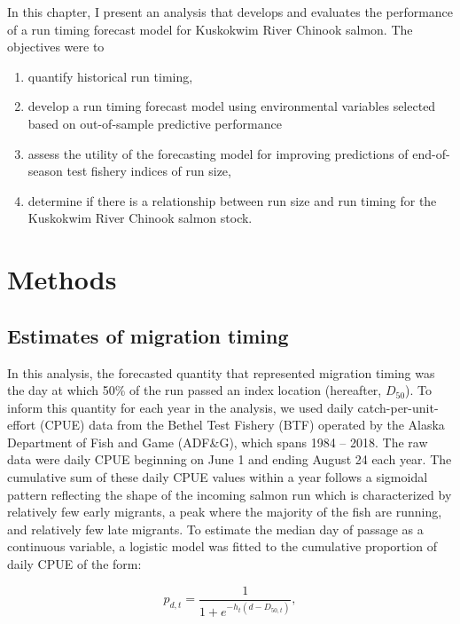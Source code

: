 \documentclass[12pt,]{book}
\providecommand{\tightlist}{%
  \setlength{\itemsep}{0pt}\setlength{\parskip}{0pt}}
\theoremstyle{definition}
\theoremstyle{definition}
\theoremstyle{definition}
\theoremstyle{remark}
\begin{document}
In this chapter, I present an analysis that develops and evaluates the
performance of a run timing forecast model for Kuskokwim River Chinook
salmon. The objectives were to

\begin{enumerate}
\def\labelenumi{(\arabic{enumi})}
\tightlist
\item
  quantify historical run timing,
\item
  develop a run timing forecast model using environmental variables
  selected based on out-of-sample predictive performance
\item
  assess the utility of the forecasting model for improving predictions
  of end-of-season test fishery indices of run size,
\item
  determine if there is a relationship between run size and run timing
  for the Kuskokwim River Chinook salmon stock.
\end{enumerate}

\section{Methods}\label{methods}

\subsection{Estimates of migration
timing}\label{estimates-of-migration-timing}

\noindent
In this analysis, the forecasted quantity that represented migration
timing was the day at which 50\% of the run passed an index location
(hereafter, \(D_{50}\)). To inform this quantity for each year in the
analysis, we used daily catch-per-unit-effort (CPUE) data from the
Bethel Test Fishery (BTF) operated by the Alaska Department of Fish and
Game (ADF\&G), which spans 1984 -- 2018. The raw data were daily CPUE
beginning on June 1 and ending August 24 each year. The cumulative sum
of these daily CPUE values within a year follows a sigmoidal pattern
reflecting the shape of the incoming salmon run which is characterized
by relatively few early migrants, a peak where the majority of the fish
are running, and relatively few late migrants. To estimate the median
day of passage as a continuous variable, a logistic model was fitted to
the cumulative proportion of daily CPUE of the form:

\begin{equation}
  p_{d,t}=\frac{1}{1 + e^{-h_t (d - D_{50,t})}},
  \label{eq:logistic}
\end{equation}
\end{document}
